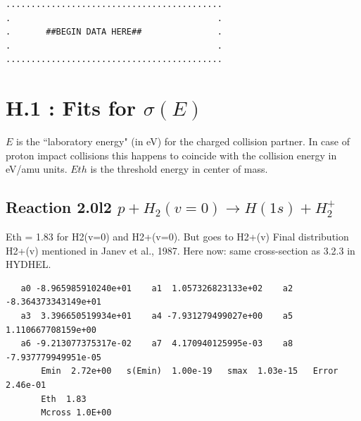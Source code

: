 \documentclass[12pt,dvipdfmx]{article}
\begin{document}
\bigskip
\begin{small}\begin{verbatim}
...........................................
.                                         .
.       ##BEGIN DATA HERE##               .
.                                         .
...........................................
\end{verbatim}\end{small}
\newpage
\renewcommand{\theHsection}{arabicsection.\thesection}
\renewcommand\thesection{\arabic{section}}
\setcounter{section}{0}  %

\section{H.1 :  Fits for $\sigma(E) $}

$E$ is the ``laboratory energy" (in eV) for the charged collision
partner. In case of proton impact collisions this happens to
coincide with the collision energy in eV/amu units. $Eth$ is the threshold
energy in center of mass.

\subsection{
Reaction 2.0l2 $   p + H_2(v=0) \rightarrow H(1s) + H_2^+$}

Eth = 1.83 for H2(v=0) and H2+(v=0). But goes to H2+(v)
Final distribution H2+(v) mentioned in Janev et al., 1987.
Here now: same cross-section as 3.2.3 in HYDHEL.

\begin{small}\begin{verbatim}
   a0 -8.965985910240e+01    a1  1.057326823133e+02    a2 -8.364373343149e+01
   a3  3.396650519934e+01    a4 -7.931279499027e+00    a5  1.110667708159e+00
   a6 -9.213077375317e-02    a7  4.170940125995e-03    a8 -7.937779949951e-05
       Emin  2.72e+00   s(Emin)  1.00e-19   smax  1.03e-15   Error  2.46e-01
       Eth  1.83
       Mcross 1.0E+00
\end{verbatim}\end{small}
\end{document}
